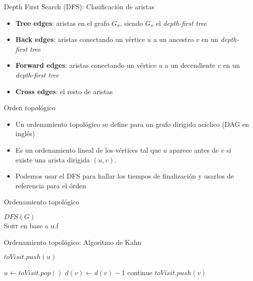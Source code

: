 \documentclass[]{beamer}
\begin{document}
\begin{frame}{Depth First Search (DFS): Clasificaci\'on de aristas}
  \begin{itemize}
    \item \textbf{Tree edges}: aristas en el grafo $G_{\pi}$, siendo $G_{\pi}$ el \textit{depth-first tree}
      \pause
    \item \textbf{Back edges}: aristas conectando un v\'ertice $u$ a un ancestro $v$ en un \textit{depth-first tree}
      \pause
    \item \textbf{Forward edges}: aristas conectando un v\'ertice $u$ a un decendiente $v$ en un \textit{depth-first tree}
      \pause
    \item \textbf{Cross edges}: el resto de aristas
  \end{itemize}
\end{frame}

\begin{frame}{Orden topol\'ogico}
  \begin{itemize}
    \item Un ordenamiento topol\'ogico se define para un grafo dirigido ac\'iclico (DAG en ingl\'es)
      \pause
    \item Es un ordenamiento lineal de los v\'ertices tal que $u$ aparece antes de $v$ si existe una arista dirigida $(u,v)$. 
      \pause
    \item Podemos usar el DFS para hallar los tiempos de finalizaci\'on y usarlos de referencia para el \'orden
  \end{itemize}
\end{frame}

\begin{frame}{Ordenamiento topol\'ogico}
  \begin{algorithm}[H]
    \textsc{$DFS(G)$} \\
    \textsc{Sort} en base a u.f
  \end{algorithm}
\end{frame}

\begin{frame}{Ordenamiento topol\'ogico: Algoritmo de Kahn}
  \begin{algorithm}[H]
    {
      {
        {$ toVisit.push(u) $} 
      }
    }

    {
      $ u \gets toVisit.pop() $
      {
        { $d(v) \gets d(v)-1 $}
        {
          continue
        }
        $ toVisit.push(v) $
      }
    }
  \end{algorithm}
\end{frame}
\end{document}

